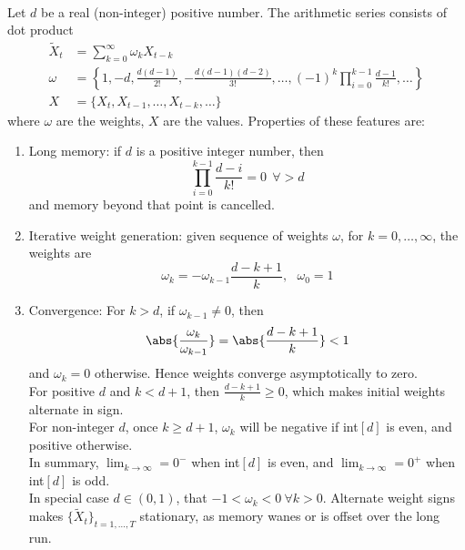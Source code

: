 \begin{remark}
\label{rmk:propfracdifffeat} 
\\
Let $d$ be a real (non-integer) positive number. The arithmetic series consists of dot product
\begin{align}
\tilde{X}_t &= \sum\limits_{k=0}^{\infty} \omega_k X_{t-k} \nonumber \\
\omega &= \left\{ 1, -d, \frac{d(d-1)}{2!}, - \frac{d(d-1)(d-2)}{3!}, \ldots, (-1)^k \prod\limits_{i=0}^{k-1} \frac{d-1}{k!}, \ldots \right\} \nonumber \\
X &= \{X_t, X_{t-1}, \ldots, X_{t-k}, \ldots \} \nonumber
\end{align}
where $\omega$ are the weights, $X$ are the values. Properties of these features are:
\begin{enumerate}[label=\roman*.]
\setlength{\itemsep}{0pt}
\item Long memory: if $d$ is a positive integer number, then
\begin{equation*}
\prod\limits_{i=0}^{k-1} \frac{d-i}{k!} = 0 \ \ \forall > d \nonumber
\end{equation*}
and memory beyond that point is cancelled.
\item Iterative weight generation: given sequence of weights $\omega$, for $k = 0, \ldots, \infty$, the weights are
\begin{equation*}
\omega_k = - \omega_{k-1} \frac{d - k + 1}{k}, \ \ \ \omega_0 = 1 \nonumber
\end{equation*}
\item Convergence: For $k > d$, if $\omega_{k-1} \neq 0$, then
\begin{equation*}
\abs{\frac{\omega_{k}}{\omega_{k-1}}} = \abs{\frac{d-k+1}{k}} < 1 \nonumber
\end{equation*}
and $\omega_k = 0$ otherwise. Hence weights converge asymptotically to zero.\\
For positive $d$ and $k < d+1$, then $\frac{d-k+1}{k} \geq 0$, which makes initial weights alternate in sign.\\
For non-integer $d$, once $k \geq d+1$, $\omega_k$ will be negative if int$[d]$ is even, and positive otherwise.\\
In summary, $\lim_{k \rightarrow \infty} = 0^-$ when int$[d]$ is even, and $\lim_{k \rightarrow \infty} = 0^+$ when int$[d]$ is odd.\\
In special case $d \in (0,1)$, that $-1 < \omega_k < 0 \ \forall k > 0$. Alternate weight signs makes $\{\tilde{X}_t \}_{t = 1, \ldots, T}$ stationary, as memory wanes or is offset over the long run.
\end{enumerate}
\end{remark}

